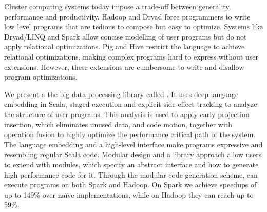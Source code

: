 Cluster computing systems today impose a trade-off between generality, performance and productivity. Hadoop and Dryad force programmers to write low level programs that are tedious to compose but easy to optimize. Systems like Dryad/LINQ and Spark allow concise modelling of user programs but do not apply relational optimizations. Pig and Hive restrict the language to achieve relational optimizations, making complex programs hard to express without user extensions. However, these extensions are cumbersome to write and disallow program optimizations.

We present a the big data processing library called \tool. It uses deep language embedding in Scala, staged execution and explicit side effect tracking to analyze the structure of user programs. This analysis is used to apply early projection insertion, which eliminates unused data, and code motion, together with operation fusion to highly optimize the performance critical path of the system. The language embedding and a high-level interface make \tool programs expressive and resembling regular Scala code. Modular design and a library approach allow users to extend \tool with modules, which specify an abstract interface and how to generate high performance code for it. Through the modular code generation scheme, \tool can execute programs on both Spark and Hadoop. On Spark we achieve speedups of up to 149\% over naïve implementations, while on Hadoop they can reach up to 59\%.